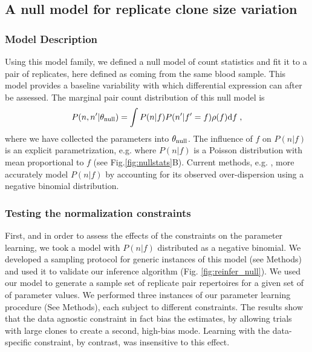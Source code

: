 \documentclass[letterpaper,english,prl,reprint,longbibliography]{revtex4-1} %
\begin{document}
\subsection*{A null model for replicate clone size variation}

\subsubsection*{Model Description}
Using this model family, we defined a null model of count statistics and fit it to a pair of replicates, here defined as coming from the same blood sample. 
This model provides a baseline variability with which differential expression can after be assessed. 
The marginal pair count distribution of this null model is  
\begin{eqnarray}
	P(n,n'|\theta_{\textrm{\textrm{null}}})=\int P(n|f)P(n'|f'=f)\rho(f)\text{d}f\;,
\end{eqnarray}
where we have collected the parameters into $\theta_{\textrm{\textrm{null}}}$. 
The influence of $f$ on $P(n|f)$ is an explicit parametrization, e.g. where $P(n|f)$ is a Poisson distribution with mean proportional to $f$ (see Fig.\ref{fig:nullstats}B). 
Current methods, e.g. \cite{Robinson2008}, more accurately model $P(n|f)$ by accounting for its observed over-dispersion using a negative binomial distribution. 

\subsubsection*{Testing the normalization constraints}
First, and in order to assess the effects of the constraints on the parameter learning, we took a model with $P(n|f)$ distributed as a negative binomial. We developed a sampling protocol for generic instances of this model (see Methods) and used it to validate our inference algorithm (Fig. \ref{fig:reinfer_null}). We used our model to generate a sample set of replicate pair repertoires for a given set of of parameter values. We performed three instances of our parameter learning procedure (See Methods), each subject to different constraints. The results show that the data agnostic constraint in fact bias the estimates, by allowing trials with large clones to create a second, high-bias mode. Learning with the data-specific constraint, by contrast, was insensitive to this effect.
\end{document}
